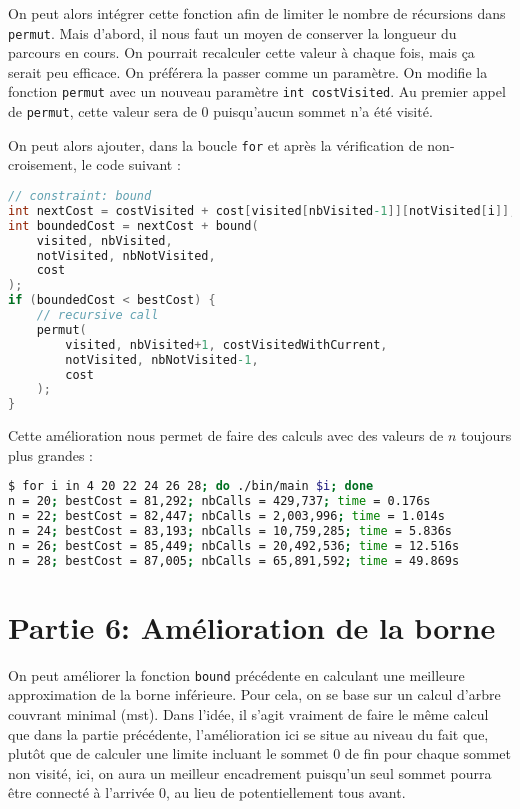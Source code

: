 On peut alors intégrer cette fonction afin de limiter le nombre de récursions dans \texttt{permut}. Mais d'abord, il nous faut un moyen de conserver la longueur du parcours en cours. On pourrait recalculer cette valeur à chaque fois, mais ça serait peu efficace. On préférera la passer comme un paramètre. On modifie la fonction \texttt{permut} avec un nouveau paramètre \texttt{int costVisited}. Au premier appel de \texttt{permut}, cette valeur sera de 0 puisqu'aucun sommet n'a été visité.

On peut alors ajouter, dans la boucle \texttt{for} et après la vérification de non-croisement, le code suivant :

\begin{lstlisting}[language=C, caption={Intégration de la contrainte de borne dans \texttt{permut}.}]
// constraint: bound
int nextCost = costVisited + cost[visited[nbVisited-1]][notVisited[i]];
int boundedCost = nextCost + bound(
    visited, nbVisited, 
    notVisited, nbNotVisited,
    cost
);
if (boundedCost < bestCost) {
    // recursive call
    permut(
        visited, nbVisited+1, costVisitedWithCurrent,
        notVisited, nbNotVisited-1,
        cost  
    );
}
\end{lstlisting}

Cette amélioration nous permet de faire des calculs avec des valeurs de \(n\) toujours plus grandes :

\begin{lstlisting}[language=bash, caption={Résultats d'exécution de l'algorithme \texttt{permut} pour différentes valeurs de \(n\).}]
$ for i in 4 20 22 24 26 28; do ./bin/main $i; done
n = 20; bestCost = 81,292; nbCalls = 429,737; time = 0.176s
n = 22; bestCost = 82,447; nbCalls = 2,003,996; time = 1.014s
n = 24; bestCost = 83,193; nbCalls = 10,759,285; time = 5.836s
n = 26; bestCost = 85,449; nbCalls = 20,492,536; time = 12.516s
n = 28; bestCost = 87,005; nbCalls = 65,891,592; time = 49.869s
\end{lstlisting}

\section{Partie 6: Amélioration de la borne}

On peut améliorer la fonction \texttt{bound} précédente en calculant une meilleure approximation de la borne inférieure. Pour cela, on se base sur un calcul d'arbre couvrant minimal (\acrfull{mst}). Dans l'idée, il s'agit vraiment de faire le même calcul que dans la partie précédente, l'amélioration ici se situe au niveau du fait que, plutôt que de calculer une limite incluant le sommet 0 de fin pour chaque sommet non visité, ici, on aura un meilleur encadrement puisqu'un seul sommet pourra être connecté à l'arrivée 0, au lieu de potentiellement tous avant.

